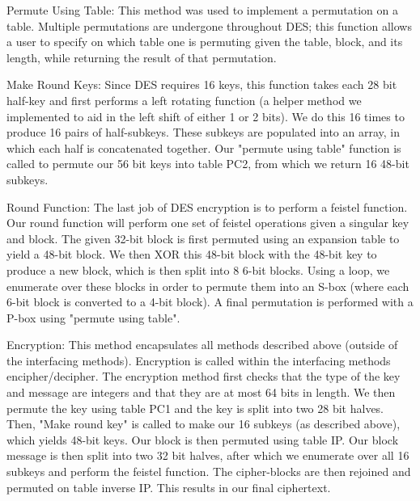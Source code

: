 \documentclass[acmlarge]{acmart}
\begin{document}
Permute Using Table: This method was used to implement a permutation on a table. Multiple permutations are undergone throughout DES; this function allows a user to specify on which table one is permuting given the table, block, and its length, while returning the result of that permutation. 

Make Round Keys: Since DES requires 16 keys, this function takes each 28 bit half-key and first performs a left rotating function (a helper method we implemented to aid in the left shift of either 1 or 2 bits). We do this 16 times to produce 16 pairs of half-subkeys. These subkeys are populated into an array, in which each half is concatenated together. Our "permute using table" function is called to permute our 56 bit keys into table PC2, from which we return 16 48-bit subkeys.

Round Function: The last job of DES encryption is to perform a feistel function. Our round function will perform one set of feistel operations given a singular key and block. The given 32-bit block is first permuted using an expansion table to yield a 48-bit block. We then XOR this 48-bit block with the 48-bit key to produce a new block, which is then split into 8 6-bit blocks. Using a loop, we enumerate over these blocks in order to permute them into an S-box (where each 6-bit block is converted to a 4-bit block). A final permutation is performed with a P-box using "permute using table". 

Encryption: This method encapsulates all methods described above (outside of the interfacing methods). Encryption is called within the interfacing methods encipher/decipher. The encryption method first checks that the type of the key and message are integers and that they are at most 64 bits in length. We then permute the key using table PC1 and the key is split into two 28 bit halves. Then, "Make round key" is called to make our 16 subkeys (as described above), which yields 48-bit keys. Our block is then permuted using table IP. Our block message is then split into two 32 bit halves, after which we enumerate over all 16 subkeys and perform the feistel function. The cipher-blocks are then rejoined and permuted on table inverse IP. This results in our final ciphertext. 
\end{document}
